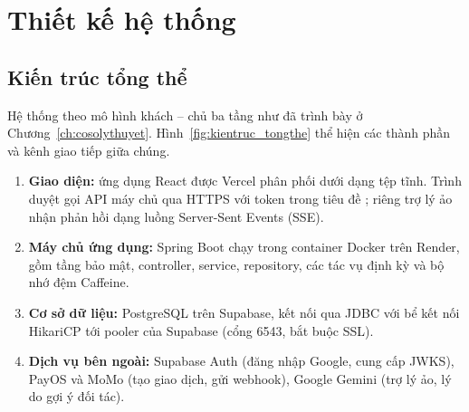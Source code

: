 \chapter{Thiết kế hệ thống}
\label{ch:thietke}

\section{Kiến trúc tổng thể}
\label{sec:kientruc}

Hệ thống theo mô hình khách -- chủ ba tầng như đã trình bày ở Chương~\ref{ch:cosolythuyet}. Hình~\ref{fig:kientruc_tongthe} thể hiện các thành phần và kênh giao tiếp giữa chúng.


\begin{enumerate}
    \item \textbf{Giao diện:} ứng dụng React được Vercel phân phối dưới dạng tệp tĩnh. Trình duyệt gọi API máy chủ qua HTTPS với token trong tiêu đề ; riêng trợ lý ảo nhận phản hồi dạng luồng Server-Sent Events (SSE).
    \item \textbf{Máy chủ ứng dụng:} Spring Boot chạy trong container Docker trên Render, gồm tầng bảo mật, controller, service, repository, các tác vụ định kỳ và bộ nhớ đệm Caffeine.
    \item \textbf{Cơ sở dữ liệu:} PostgreSQL trên Supabase, kết nối qua JDBC với bể kết nối HikariCP tới pooler của Supabase (cổng 6543, bắt buộc SSL).
    \item \textbf{Dịch vụ bên ngoài:} Supabase Auth (đăng nhập Google, cung cấp JWKS), PayOS và MoMo (tạo giao dịch, gửi webhook), Google Gemini (trợ lý ảo, lý do gợi ý đối tác).
\end{enumerate}

